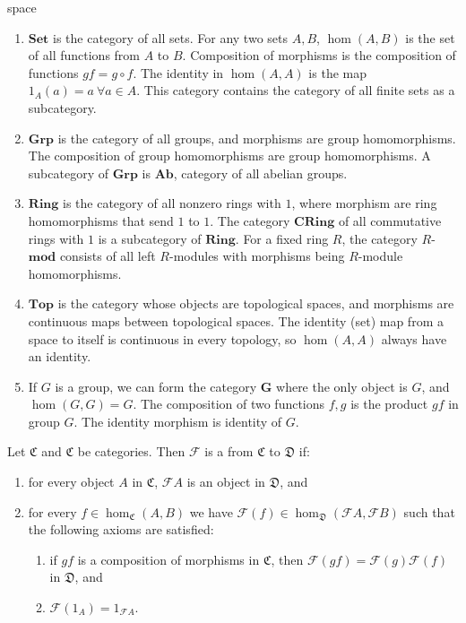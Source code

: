 \begin{example}{\color{white}space}
\begin{enumerate}[label=(\roman*)]
\setlength{\itemsep}{0pt}
\item $\textbf{Set}$ is the category of all sets. For any two sets $A,B$, $\hom (A,B)$ is the set of all functions from $A$ to $B$. Composition of morphisms is the composition of functions $gf = g \circ f$. The identity in $\hom (A,A)$ is the map $1_A(a)=a \  \forall a \in A$. This category contains the category of all finite sets as a subcategory.
\item $\textbf{Grp}$ is the category of all groups, and morphisms are group homomorphisms. The composition of group homomorphisms are group homomorphisms. A subcategory of $\textbf{Grp}$ is $\textbf{Ab}$, category of all abelian groups.
\item $\textbf{Ring}$ is the category of all nonzero rings with $1$, where morphism are ring homomorphisms that send $1$ to $1$. The category $\textbf{CRing}$ of all commutative rings with $1$ is a subcategory of $\textbf{Ring}$. For a fixed ring $R$, the category $R$-$\textbf{mod}$ consists of all left $R$-modules with morphisms being $R$-module homomorphisms.
\item $\textbf{Top}$ is the category whose objects are topological spaces, and morphisms are continuous maps between topological spaces. The identity (set) map from a space to itself is continuous in every topology, so $\hom (A,A)$ always have an identity.
\item If $G$ is a group, we can form the category $\textbf{G}$ where the only object is $G$, and $\hom (G,G) = G$. The composition of two functions $f,g$ is the product $gf$ in group $G$. The identity morphism is identity of $G$.
\end{enumerate}
\end{example}

\begin{definition}
Let $\mathfrak{C}$ and $\mathfrak{C}$ be categories. Then $\mathcal{F}$ is a  from $\mathfrak{C}$ to $\mathfrak{D}$ if:
\begin{enumerate}[label=(\roman*)]
\setlength{\itemsep}{0pt}
\item for every object $A$ in $\mathfrak{C}$, $\mathcal{F}A$ is an object in $\mathfrak{D}$, and
\item for every $f \in \hom_{\mathfrak{C}} (A,B)$ we have $\mathcal{F}(f) \in \hom_{\mathfrak{D}}(\mathcal{F}A, \mathcal{F}B)$ such that the following axioms are satisfied:
\begin{enumerate}[label=\arabic*.]
\setlength{\itemsep}{0pt}
\item if $gf$ is a composition of morphisms in $\mathfrak{C}$, then $\mathcal{F}(gf) = \mathcal{F}(g) \mathcal{F}(f)$ in $\mathfrak{D}$, and
\item $\mathcal{F}(1_A) = 1_{\mathcal{F}A}$.
\end{enumerate}
\end{enumerate}
\end{definition}

